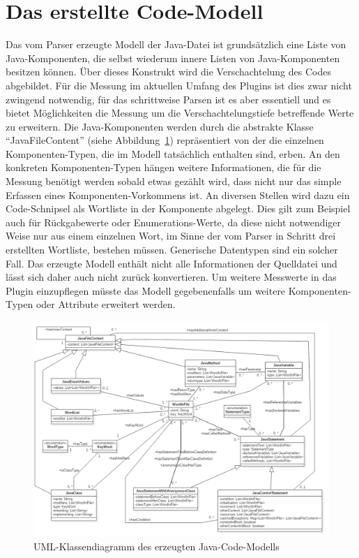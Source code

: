\documentclass[gb,ngerman]{stthesis}
\begin{document}
		\section{Das erstellte Code-Modell}
			Das vom Parser erzeugte Modell der Java-Datei ist grundsätzlich eine Liste von Java-Komponenten, die selbst wiederum innere Listen von Java-Komponenten besitzen können. Über dieses Konstrukt wird die Verschachtelung des Codes abgebildet. Für die Messung im aktuellen Umfang des Plugins ist dies zwar nicht zwingend notwendig, für das schrittweise Parsen ist es aber essentiell und es bietet Möglichkeiten die Messung um die Verschachtelungstiefe betreffende Werte zu erweitern. Die Java-Komponenten werden durch die abstrakte Klasse "`JavaFileContent"' (siehe Abbildung~\ref{umlmodel}) repräsentiert von der die einzelnen Komponenten-Typen, die im Modell tatsächlich enthalten sind, erben. An den konkreten Komponenten-Typen hängen weitere Informationen, die für die Messung benötigt werden sobald etwas gezählt wird, dass nicht nur das simple Erfassen eines Komponenten-Vorkommens ist. An diversen Stellen wird dazu ein Code-Schnipsel als Wortliste in der Komponente abgelegt. Dies gilt zum Beispiel auch für Rückgabewerte oder Enumerations-Werte, da diese nicht notwendiger Weise nur aus einem einzelnen Wort, im Sinne der vom Parser in Schritt drei erstellten Wortliste, bestehen müssen. Generische Datentypen sind ein solcher Fall. \newline
			Das erzeugte Modell enthält nicht alle Informationen der Quelldatei und lässt sich daher auch nicht zurück konvertieren. Um weitere Messwerte in das Plugin einzupflegen müsste das Modell gegebenenfalls um weitere Komponenten-Typen oder Attribute erweitert werden. 
			\begin{figure} [h]
				\includegraphics [width=\textwidth] {model.png}
				\caption{UML-Klassendiagramm des erzeugten Java-Code-Modells}
				\label{umlmodel}
			\end{figure}
\end{document}
